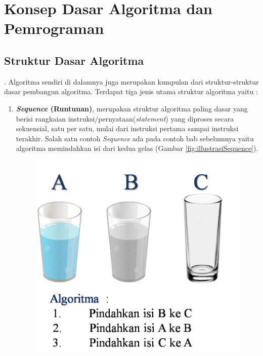 \chapter{Konsep Dasar Algoritma dan Pemrograman}\label{ch:konsepDasarAlgoritma}

\section{Struktur Dasar Algoritma}

. Algoritma sendiri di dalamnya juga merupakan kumpulan dari struktur-struktur dasar pembangun algoritma. Terdapat tiga jenis utama struktur algoritma yaitu : 

\begin{enumerate}
	\item \textbf{\textit{Sequence} (Runtunan)}, merupakan struktur algoritma paling dasar yang berisi rangkaian instruksi/pernyataan(\textit{statement}) yang diproses secara sekuensial, satu per satu, mulai dari instruksi pertama sampai instruksi terakhir. Salah satu contoh \textit{Sequence} ada pada contoh bab sebelumnya yaitu algoritma memindahkan isi dari kedua gelas (Gambar \ref{fig:illustrasiSequence}). 
	\begin{figure}
		\centering
		\includegraphics[scale=0.4]{fig/1/Gambar13.png}	

\end{figure}
\end{enumerate}
